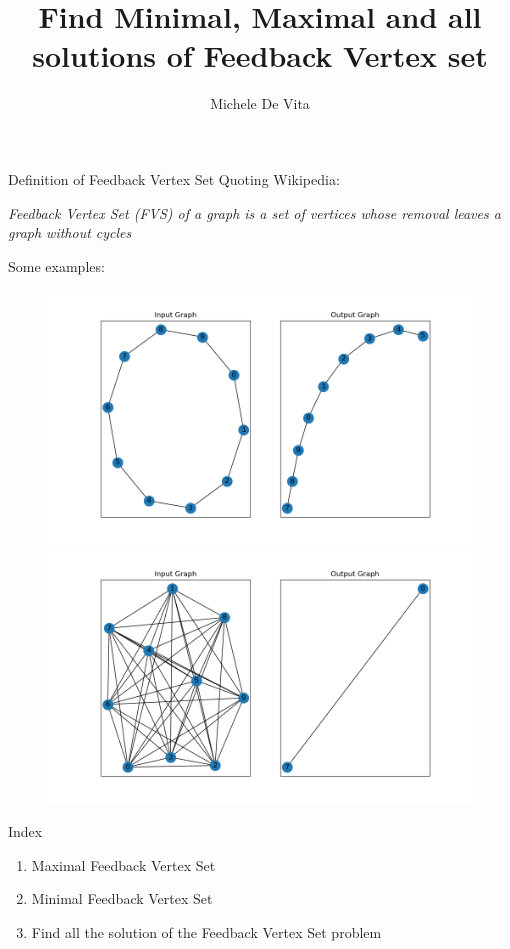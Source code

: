 \documentclass[11pt]{beamer}
\begin{document}
	\author{Michele De Vita}
	\title{Find Minimal, Maximal and all solutions of Feedback Vertex set}
	\begin{frame}[plain]
		\maketitle
	\end{frame}
	\begin{frame}{Definition of Feedback Vertex Set}
		Quoting Wikipedia:
		\begin{center}
			\textit{Feedback Vertex Set (FVS) of a graph is a set of vertices whose removal leaves a graph without cycles}
		\end{center}
		
		\small \begin{center} Some examples: \end{center}
		
		\begin{figure}
			\centering
			\includegraphics[width=0.45\linewidth]{../plots/cycle_graph}
			\includegraphics[width=0.45\linewidth]{../plots/complete_graph}
			\label{fig:cyclegraph}
		\end{figure}
		
	\end{frame}
	\begin{frame}{Index}
		\begin{enumerate}
			\item Maximal Feedback Vertex Set
			\item Minimal Feedback Vertex Set
			\item Find all the solution of the Feedback Vertex Set problem
		\end{enumerate}
	\end{frame}
\end{document}
